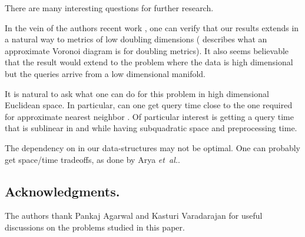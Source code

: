 \documentclass[12pt]{article}
\theoremstyle{remark}{\theorembodyfont{\rm} \newtheorem{remark}[theorem]{Remark}}
\newcommand{\etal}{\textit{et~al.}\xspace}
\begin{document}
There are many interesting questions for further research.
\begin{compactenum}[\qquad (A)]
    \item In the vein of the authors recent work \cite{hk-annsl-11},
    one can verify that our results extends in a natural way
    to metrics of low doubling dimensions (\cite{hk-annsl-11}
    describes what an approximate Voronoi diagram is for doubling
    metrics). It also seems believable that the result would extend to
    the problem where the data is high dimensional but the queries
    arrive from a low dimensional manifold.
    
    \item It is natural to ask what one can do for this problem in
    high dimensional Euclidean space. In particular, can one get query
    time close to the one required for approximate nearest neighbor
    \cite{im-anntr-98, him-anntr-12}. Of particular interest is getting a query time
    that is sublinear in  and  while having subquadratic space
    and preprocessing time.
    
    \item The dependency on  in our data-structures may
    not be optimal. One can probably get space/time tradeoffs, as done by
    Arya \etal \cite{amm-sttan-09}.
\end{compactenum}


\subsection*{Acknowledgments.}

The authors thank Pankaj Agarwal and Kasturi Varadarajan for useful
discussions on the problems studied in this paper.







\end{document}

